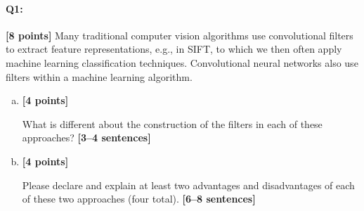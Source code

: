 
\pagebreak

\paragraph{Q1:} \textbf{[8 points]} Many traditional computer vision algorithms use convolutional filters to extract feature representations, e.g., in SIFT, to which we then often apply machine learning classification techniques. Convolutional neural networks also use filters within a machine learning algorithm.

\begin{enumerate} [(a)]
\item \textbf{[4 points]}

\begin{tcolorbox}[colback=orange!5!white,colframe=orange!75!black]
What is different about the construction of the filters in each of these approaches? \textbf{[3--4 sentences]}
\end{tcolorbox}

\pagebreak
\item \textbf{[4 points]}
\begin{tcolorbox}[colback=orange!5!white,colframe=orange!75!black]
Please declare and explain at least two advantages and disadvantages of each of these two approaches (four total). \textbf{[6--8 sentences]}
\end{tcolorbox}
\end{enumerate}


